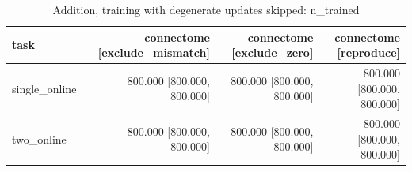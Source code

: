 \begin{table}[t]
\centering
\small
\begin{tabular}{lrrr}
\toprule
task & connectome [exclude\_mismatch] & connectome [exclude\_zero] & connectome [reproduce] \\
\midrule
single\_online & 800.000 [800.000, 800.000] & 800.000 [800.000, 800.000] & 800.000 [800.000, 800.000] \\
two\_online & 800.000 [800.000, 800.000] & 800.000 [800.000, 800.000] & 800.000 [800.000, 800.000] \\
\bottomrule
\end{tabular}
\caption{Addition, training with degenerate updates skipped: n\_trained}
\label{tab:kc_diag_n_trained}
\end{table}